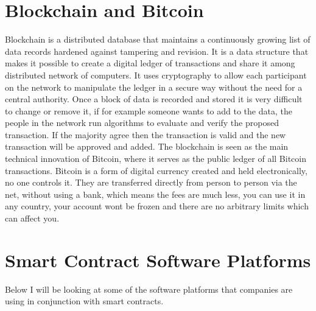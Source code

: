 \documentclass[12pt]{article}
\begin{document}
\section{Blockchain and Bitcoin}
Blockchain is a distributed database that maintains a continuously growing list of data records hardened against tampering and revision. It is a data structure that makes it possible to create a digital ledger of transactions and share it among distributed network of computers. It uses cryptography to allow each participant on the network to manipulate the ledger in a secure way without the need for a central authority. Once  a block of data is recorded and stored it is very difficult to change or remove it, if for example someone wants to add to the data, the people in the network run algorithms to evaluate and verify the proposed transaction. If the majority agree then the transaction is valid and the new transaction will be approved and added. 
\newline
\newline
The blockchain is seen as the main technical innovation of Bitcoin, where it serves as the public ledger of all Bitcoin transactions. Bitcoin is a form of digital currency created and held electronically, no one controls it. They are transferred directly from person to person via the net, without using a bank, which means the fees are much less, you can use it in any country, your account wont be frozen and there are no arbitrary limits which can affect you. 

\newpage

\section{Smart Contract Software Platforms}
Below I will be looking at some of the software platforms that companies are using in conjunction with smart contracts. 
\end{document}
